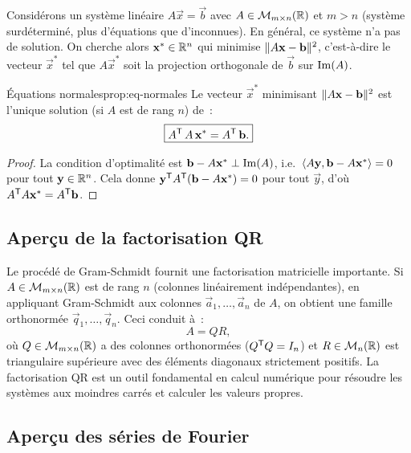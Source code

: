 Considérons un système linéaire $A\vec{x}=\vec{b}$ avec
$A\in\mathcal{M}_{m\times n}({\mathbb{R}})$ et $m>n$ (système surdéterminé, plus
d'équations que d'inconnues). En général, ce système n'a pas de
solution. On cherche alors $\mathbf{x}^*\in{\mathbb{R}}^n$ qui minimise
$\lVert A\mathbf{x}-\mathbf{b}\rVert^2$, c'est-à-dire le vecteur $\vec{x}^*$ tel
que $A\vec{x}^*$ soit la projection orthogonale de $\vec{b}$ sur
$\operatorname{Im}(A)$.

\begin{proposition}{Équations normales}{prop:eq-normales}
  Le vecteur $\vec{x}^*$ minimisant $\lVert A\mathbf{x}-\mathbf{b}\rVert^2$ est
  l'unique solution (si $A$ est de rang $n$) de~:
  \[
    \boxed{{A}^{\mathsf{T}}\,A\,\mathbf{x}^*={A}^{\mathsf{T}}\,\mathbf{b}.}
  \]
\end{proposition}

\begin{proof}
  La condition d'optimalité est $\mathbf{b}-A\mathbf{x}^*\perp\operatorname{Im}(A)$, i.e.\
  $\langle A\mathbf{y},\mathbf{b}-A\mathbf{x}^*\rangle=0$ pour tout $\mathbf{y}\in{\mathbb{R}}^n$.
  Cela donne ${\mathbf{y}}^{\mathsf{T}}{A}^{\mathsf{T}}(\mathbf{b}-A\mathbf{x}^*)=0$
  pour tout $\vec{y}$, d'où
  ${A}^{\mathsf{T}}A\mathbf{x}^*={A}^{\mathsf{T}}\mathbf{b}$.
\end{proof}

\subsection{Aperçu de la factorisation QR}\label{subsec:QR}

Le procédé de Gram-Schmidt fournit une factorisation matricielle
importante. Si $A\in\mathcal{M}_{m\times n}({\mathbb{R}})$ est de rang $n$ (colonnes
linéairement indépendantes), en appliquant Gram-Schmidt aux colonnes
$\vec{a}_1,\ldots,\vec{a}_n$ de $A$, on obtient une famille
orthonormée $\vec{q}_1,\ldots,\vec{q}_n$. Ceci conduit à~:
\[
  A=QR,
\]
où $Q\in\mathcal{M}_{m\times n}({\mathbb{R}})$ a des colonnes orthonormées
(${Q}^{\mathsf{T}}Q=I_n$) et $R\in\mathcal{M}_n({\mathbb{R}})$ est triangulaire supérieure
avec des éléments diagonaux strictement positifs. La factorisation QR
est un outil fondamental en calcul numérique pour résoudre les systèmes
aux moindres carrés et calculer les valeurs propres.

\subsection{Aperçu des séries de Fourier}\label{subsec:fourier}

